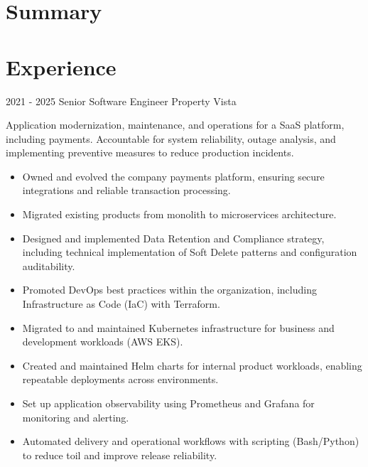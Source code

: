\documentclass[10pt,a4paper,sans]{moderncv}   %
\begin{document}
\makecvtitle

\section{Summary}

\section{Experience}

\cventry
  {2021 - 2025}
  {Senior Software Engineer}
  {Property Vista}
  {}{}
  {
    \vspace{0.5em}
    Application modernization, maintenance, and operations for a SaaS platform, including payments. Accountable for system reliability, outage analysis, and implementing preventive measures to reduce production incidents.
    \begin{itemize}
      \item Owned and evolved the company payments platform, ensuring secure integrations and reliable transaction processing.
      \item Migrated existing products from monolith to microservices architecture.
      \item Designed and implemented Data Retention and Compliance strategy, including technical implementation of Soft Delete patterns and configuration auditability.
      \item Promoted DevOps best practices within the organization, including Infrastructure as Code (IaC) with Terraform.
      \item Migrated to and maintained Kubernetes infrastructure for business and development workloads (AWS EKS).
      \item Created and maintained Helm charts for internal product workloads, enabling repeatable deployments across environments.
      \item Set up application observability using Prometheus and Grafana for monitoring and alerting.
      \item Automated delivery and operational workflows with scripting (Bash/Python) to reduce toil and improve release reliability.
    \end{itemize}
    \vspace{1em}
  }
\end{document}

